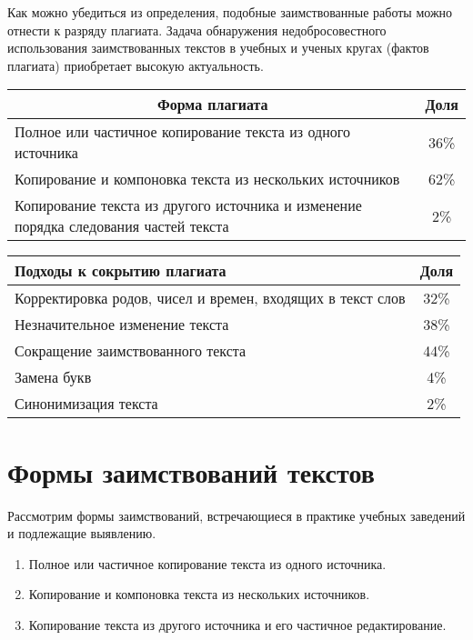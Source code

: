 \begin{multicols}{2}
  Как можно убедиться из определения, подобные заимствованные работы 
можно отнести к разряду плагиата. Задача обнаружения недобросовестного 
использования заимствованных текстов в учебных и ученых кругах (фактов 
плагиата) приобретает высокую актуальность.

\begin{table*}\small
\begin{center}
\vspace*{2ex}

\begin{tabular}{|l|c|}
\hline
\multicolumn{1}{|c|}{Форма плагиата}&Доля\\
\hline
Полное или частичное копирование текста из одного источника&36\%\\
Копирование и компоновка текста из нескольких источников&62\%\\
Копирование текста из другого источника и изменение порядка следования частей 
текста&\hphantom{9}2\%\\
\hline
\end{tabular}
\end{center}
\begin{center}
\vspace*{2ex}

\tabcolsep=8pt
\begin{tabular}{|l|c|}
\hline
Подходы к сокрытию плагиата&Доля\\
\hline
Корректировка родов, чисел и времен, входящих в текст слов&32\%\\
Незначительное изменение текста&38\%\\
Сокращение заимствованного текста&44\%\\
Замена букв&\hphantom{9}4\%\\
Синонимизация текста&\hphantom{9}2\%\\
\hline
\end{tabular}
\end{center}
\end{table*}

\section{Формы заимствований текстов}

  Рассмотрим формы заимствований, встре\-ча\-ющи\-еся в практике учебных 
заведений и подлежащие выявлению. 
  \begin{enumerate}[1.]
  \item Полное или частичное копирование текста из одного источника. 
  \item Копирование и компоновка текста из нескольких источников.
  \item Копирование текста из другого источника и его частичное 
редактирование.
  \end{enumerate}
  

\end{multicols}
